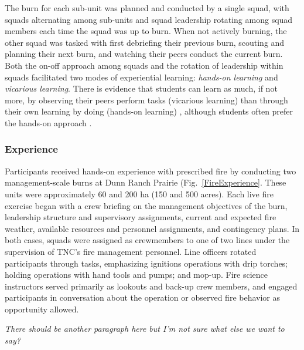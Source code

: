 \documentclass[fire,article,submit,moreauthors,pdftex]{Definitions/mdpi}
\begin{document}
The burn for each sub-unit was planned and conducted by a single squad, with squads alternating among sub-units and squad leadership rotating among squad members each time the squad was up to burn.
When not actively burning, the other squad was tasked with first debriefing their previous burn, scouting and planning their next burn, and watching their peers conduct the current burn.
Both the on-off approach among squads and the rotation of leadership within squads facilitated two modes of experiential learning: \emph{hands-on learning} and \emph{vicarious learning}.
There is evidence that students can learn as much, if not more, by observing their peers perform tasks (vicarious learning) than through their own learning by doing (hands-on learning) \citep{stegmann2012}, although students often prefer the hands-on approach \citep{reime2017}.

\hypertarget{experience}{%
\subsubsection{Experience}\label{experience}}

Participants received hands-on experience with prescribed fire by conducting two management-scale burns at Dunn Ranch Prairie (Fig.~\ref{FireExperience}.
These units were approximately 60 and 200 ha (150 and 500 acres).
Each live fire exercise began with a crew briefing on the management objectives of the burn, leadership structure and supervisory assignments, current and expected fire weather, available resources and personnel assignments, and contingency plans.
In both cases, squads were assigned as crewmembers to one of two lines under the supervision of TNC's fire management personnel.
Line officers rotated participants through tasks, emphasizing ignitions operations with drip torches; holding operations with hand tools and pumps; and mop-up.
Fire science instructors served primarily as lookouts and back-up crew members, and engaged participants in conversation about the operation or observed fire behavior as opportunity allowed.

\emph{There should be another paragraph here but I'm not sure what else we want to say?}
\end{document}

